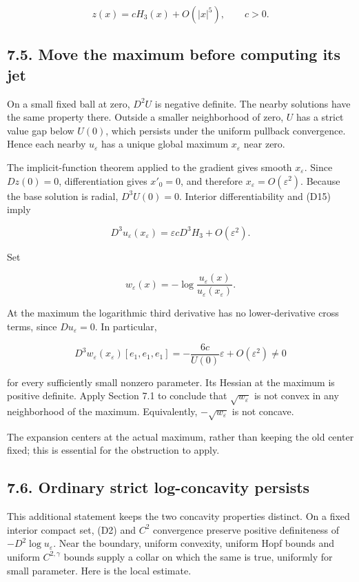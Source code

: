 \documentclass[11pt]{article}
\begin{document}
\[z(x)=cH_3(x)+O(|x|^5),\qquad c>0. \tag{D15}\]

\subsection{7.5. Move the maximum before computing its
jet}\label{move-the-maximum-before-computing-its-jet}

On a small fixed ball at zero, \(D^2U\) is negative definite. The nearby
solutions have the same property there. Outside a smaller neighborhood
of zero, \(U\) has a strict value gap below \(U(0)\), which persists
under the uniform pullback convergence. Hence each nearby
\(u_\varepsilon\) has a unique global maximum \(x_\varepsilon\) near
zero.

The implicit-function theorem applied to the gradient gives smooth
\(x_\varepsilon\). Since \(Dz(0)=0\), differentiation gives \(x'_0=0\),
and therefore \(x_\varepsilon=O(\varepsilon^2)\). Because the base
solution is radial, \(D^3U(0)=0\). Interior differentiability and (D15)
imply

\[D^3u_\varepsilon(x_\varepsilon)
 =\varepsilon cD^3H_3+O(\varepsilon^2). \tag{D16}\]

Set

\[w_\varepsilon(x)=-\log\frac{u_\varepsilon(x)}
                                      {u_\varepsilon(x_\varepsilon)}.\]

At the maximum the logarithmic third derivative has no lower-derivative
cross terms, since \(Du_\varepsilon=0\). In particular,

\[D^3w_\varepsilon(x_\varepsilon)[e_1,e_1,e_1]
 =-\frac{6c}{U(0)}\varepsilon+O(\varepsilon^2)\ne0 \tag{D17}\]

for every sufficiently small nonzero parameter. Its Hessian at the
maximum is positive definite. Apply Section 7.1 to conclude that
\(\sqrt{w_\varepsilon}\) is not convex in any neighborhood of the
maximum. Equivalently, \(-\sqrt{w_\varepsilon}\) is not concave.

The expansion centers at the actual maximum, rather than keeping the old
center fixed; this is essential for the obstruction to apply.

\subsection{7.6. Ordinary strict log-concavity
persists}\label{ordinary-strict-log-concavity-persists}

This additional statement keeps the two concavity properties distinct.
On a fixed interior compact set, (D2) and \(C^2\) convergence preserve
positive definiteness of \(-D^2\log u_\varepsilon\). Near the boundary,
uniform convexity, uniform Hopf bounds and uniform \(C^{2,\gamma}\)
bounds supply a collar on which the same is true, uniformly for small
parameter. Here is the local estimate.
\end{document}

